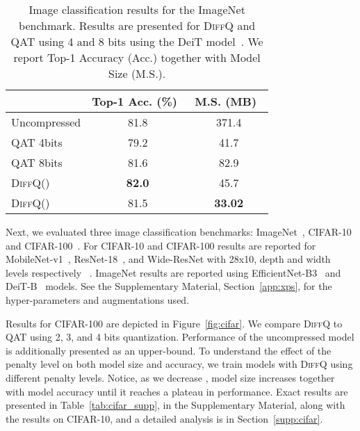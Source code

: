 \documentclass{article}
\newcommand{\diffq}{\textsc{DiffQ}\xspace}
\begin{document}
\begin{table}[t!]
\caption{Image classification results for the ImageNet benchmark. Results are presented for \diffq and QAT using 4 and 8 bits using the DeiT model~\citep{touvron2020training}. We report Top-1 Accuracy (Acc.) together with Model Size (M.S.).}
\label{tab:imagenet}
\vskip 0.15in
\begin{center}
\begin{small}
\begin{sc}
\begin{tabular}{l|cc}
\toprule
		& Top-1 Acc. (\%)~ & M.S. (MB)~ \\
\midrule
Uncompressed    	                & 81.8 		   & 371.4 \\
\midrule
QAT 4bits    		                & 79.2         & 41.7  \\
QAT 8bits    		                & 81.6         & 82.9 \\
\midrule
\diffq ()  	    & \textbf{82.0}      & 45.7  \\
\diffq ()  	                & 81.5      & \textbf{33.02}  \\
\bottomrule
\end{tabular}
\end{sc}
\end{small}
\end{center}
\vskip -0.1in
\end{table}

Next, we evaluated three image classification benchmarks: ImageNet~\cite{imagenet_cvpr09}, CIFAR-10 and CIFAR-100~\cite{krizhevsky2009learning}. For CIFAR-10 and CIFAR-100 results are reported for MobileNet-v1~\cite{howard2017mobilenets}, ResNet-18~\cite{he2016deep}, and Wide-ResNet with 28x10, depth and width levels respectively ~\cite{zagoruyko2016wide}. ImageNet results are reported using EfficientNet-B3~\cite{tan2019efficientnet} and DeiT-B~\cite{touvron2020training} models. 
See the Supplementary Material, Section~\ref{app:xps}, for the hyper-parameters and augmentations used.

Results for CIFAR-100 are depicted in Figure~\ref{fig:cifar}. We compare \diffq to QAT using 2, 3, and 4 bits quantization. Performance of the uncompressed model is additionally presented as an upper-bound. 
To understand the effect of the penalty level  on both model size and accuracy, we train models with \diffq using different penalty levels. Notice, as we decrease , model size increases together with model accuracy until it reaches a plateau in performance. 
Exact results are presented in Table~\ref{tab:cifar_supp}, in the Supplementary Material, along with the results on CIFAR-10, and a detailed analysis is in Section~\ref{supp:cifar}.
\end{document}
